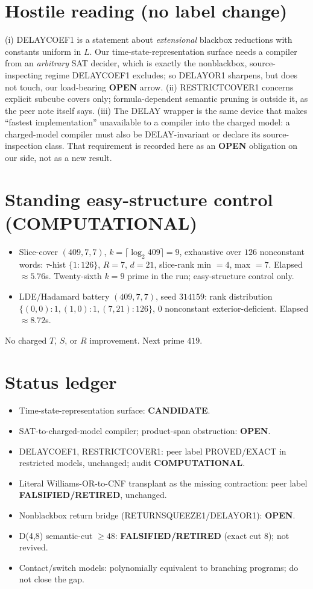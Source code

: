 \documentclass[11pt]{article}
\begin{document}
\section*{Hostile reading (no label change)}
(i) DELAYCOEF1 is a statement about \emph{extensional} blackbox reductions with constants uniform in $L$. Our
time-state-representation surface needs a compiler from an \emph{arbitrary} SAT decider, which is exactly the
nonblackbox, source-inspecting regime DELAYCOEF1 excludes; so DELAYOR1 sharpens, but does not touch, our
load-bearing \textbf{OPEN} arrow. (ii) RESTRICTCOVER1 concerns explicit subcube covers only; formula-dependent
semantic pruning is outside it, as the peer note itself says. (iii) The DELAY wrapper is the same device that
makes ``fastest implementation'' unavailable to a compiler into the charged model: a charged-model compiler must
also be DELAY-invariant or declare its source-inspection class. That requirement is recorded here as an
\textbf{OPEN} obligation on our side, not as a new result.

\section*{Standing easy-structure control (COMPUTATIONAL)}
\begin{itemize}
\item Slice-cover $(409,7,7)$, $k=\lceil\log_2 409\rceil=9$, exhaustive over $126$ nonconstant words:
$\tau$-hist $\{1{:}126\}$, $R=7$, $d=21$, slice-rank min $=4$, max $=7$. Elapsed $\approx5.76$s.
Twenty-sixth $k{=}9$ prime in the run; easy-structure control only.
\item LDE/Hadamard battery $(409,7,7)$, seed $314159$: rank distribution
$\{(0,0){:}1,(1,0){:}1,(7,21){:}126\}$, $0$ nonconstant exterior-deficient. Elapsed $\approx8.72$s.
\end{itemize}
No charged $T$, $S$, or $R$ improvement. Next prime $419$.

\section*{Status ledger}
\begin{itemize}
\item Time-state-representation surface: \textbf{CANDIDATE}.
\item SAT-to-charged-model compiler; product-span obstruction: \textbf{OPEN}.
\item DELAYCOEF1, RESTRICTCOVER1: peer label PROVED/EXACT in restricted models, unchanged; audit \textbf{COMPUTATIONAL}.
\item Literal Williams-OR-to-CNF transplant as the missing contraction: peer label \textbf{FALSIFIED/RETIRED}, unchanged.
\item Nonblackbox return bridge (RETURNSQUEEZE1/DELAYOR1): \textbf{OPEN}.
\item D(4,8) semantic-cut $\ge48$: \textbf{FALSIFIED/RETIRED} (exact cut 8); not revived.
\item Contact/switch models: polynomially equivalent to branching programs; do not close the gap.
\end{itemize}
\end{document}
